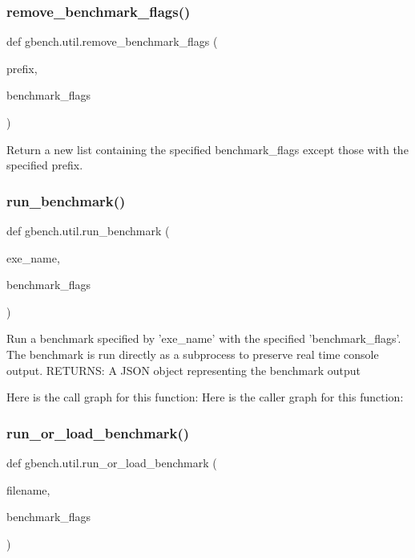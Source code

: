 \subsubsection{\texorpdfstring{remove\+\_\+benchmark\+\_\+flags()}{remove\_benchmark\_flags()}}
{\footnotesize\ttfamily def gbench.\+util.\+remove\+\_\+benchmark\+\_\+flags (\begin{DoxyParamCaption}\item[{}]{prefix,  }\item[{}]{benchmark\+\_\+flags }\end{DoxyParamCaption})}

\begin{DoxyVerb}Return a new list containing the specified benchmark_flags except those
with the specified prefix.
\end{DoxyVerb}
 \mbox{\label{namespacegbench_1_1util_ad31457115437aaf422451b7f302b36dd}} 
\subsubsection{\texorpdfstring{run\+\_\+benchmark()}{run\_benchmark()}}
{\footnotesize\ttfamily def gbench.\+util.\+run\+\_\+benchmark (\begin{DoxyParamCaption}\item[{}]{exe\+\_\+name,  }\item[{}]{benchmark\+\_\+flags }\end{DoxyParamCaption})}

\begin{DoxyVerb}Run a benchmark specified by 'exe_name' with the specified
'benchmark_flags'. The benchmark is run directly as a subprocess to preserve
real time console output.
RETURNS: A JSON object representing the benchmark output
\end{DoxyVerb}
 Here is the call graph for this function\+:
Here is the caller graph for this function\+:
\mbox{\label{namespacegbench_1_1util_a4ebe890db77f6434598541c4460602cb}} 
\subsubsection{\texorpdfstring{run\+\_\+or\+\_\+load\+\_\+benchmark()}{run\_or\_load\_benchmark()}}
{\footnotesize\ttfamily def gbench.\+util.\+run\+\_\+or\+\_\+load\+\_\+benchmark (\begin{DoxyParamCaption}\item[{}]{filename,  }\item[{}]{benchmark\+\_\+flags }\end{DoxyParamCaption})}

